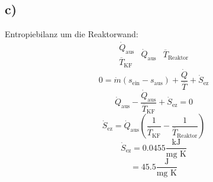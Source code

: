 \subsection*{c)}
Entropiebilanz um die Reaktorwand:
\[
\begin{array}{c}
\dot{Q}_{\text{aus}} \\
\overline{T}_{\text{KF}}
\end{array}
\begin{array}{c}
\dot{Q}_{\text{aus}}
\end{array}
\begin{array}{c}
\overline{T}_{\text{Reaktor}}
\end{array}
\]
\[
0 = \dot{m} (s_{\text{ein}} - s_{\text{aus}}) + \frac{\dot{Q}}{\overline{T}} + \dot{S}_{\text{ez}}
\]
\[
\dot{Q}_{\text{aus}} - \frac{\dot{Q}_{\text{aus}}}{\overline{T}_{\text{KF}}} + \dot{S}_{\text{ez}} = 0
\]
\[
\dot{S}_{\text{ez}} = \dot{Q}_{\text{aus}} \left( \frac{1}{\overline{T}_{\text{KF}}} - \frac{1}{\overline{T}_{\text{Reaktor}}} \right)
\]
\[
\dot{S}_{\text{ez}} = 0.0455 \frac{\text{kJ}}{\text{mg K}}
\]
\[
= 45.5 \frac{\text{J}}{\text{mg K}}
\]
